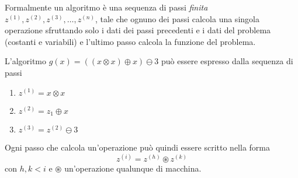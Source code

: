 Formalmente un algoritmo è una sequenza di passi \emph{finita} $z^{(1)}, z^{(2)}, z^{(3)}, \dots, z^{(n)}$, tale che ognuno dei passi calcola una singola operazione sfruttando solo i dati dei passi precedenti e i dati del problema (costanti e variabili) e l'ultimo passo calcola la funzione del problema.

\begin{example}
    L'algoritmo $g(x) = ((x \otimes x) \oplus x) \ominus 3$ può essere espresso dalla sequenza di passi \begin{enumerate}
        \item $z^{(1)} = x \otimes x$ 
        \item $z^{(2)} = z_1 \oplus x$
        \item $z^{(3)} = z^{(2)} \ominus 3$
    \end{enumerate} 
\end{example}

Ogni passo che calcola un'operazione può quindi essere scritto nella forma \[
    z^{(i)} = z^{(h)} \circledast z^{(k)}
\] con $h, k < i$ e $\circledast$ un'operazione qualunque di macchina. 


